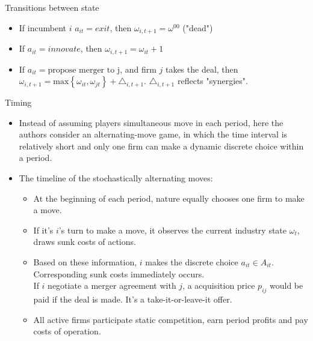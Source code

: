 \documentclass[aspectratio=169]{beamer}  %
\begin{document}
\begin{frame}{Transitions between state}
    \begin{itemize}
    \item If incumbent $i$ $a_{it}=exit$, then $\omega_{i,t+1}=\omega^{00}$ ("dead")\\
    \item If $a_{it}=innovate$, then $\omega_{i,t+1}=\omega_{it}+1$ \\
    \item If $a_{it}=\text{propose  merger  to j}$, and firm $j$ takes the deal, then $\omega_{i,t+1}=\text{max}\left\{\omega_{it}, \omega_{jt}\right\}+\triangle_{i, t+1}$. $\triangle_{i, t+1}$ reflects "synergies".
    
    \end{itemize}
\end{frame}

\begin{frame}{Timing}
    \begin{itemize}
    \item Instead of assuming players simultaneous move in each period, here the authors consider an alternating-move game, in which the time interval is relatively short and only one firm can make a dynamic discrete choice within a period. 
    \item The timeline of the stochastically alternating moves:
        \begin{itemize}
            \item At the beginning of each period, nature equally chooses one firm to make a move.
            \item If it's $i$'s turn to make a move, it observes the current industry state $\omega_t$, draws sunk costs of actions.
            \item Based on these information, $i$ makes the discrete choice $a_{it} \in A_{it}$. Corresponding sunk costs immediately occurs. \\
            If $i$ negotiate a merger agreement with $j$, a acquisition price $p_{ij}$ would be paid if the deal is made. It's a take-it-or-leave-it offer.
            \item All active firms participate static competition, earn period profits and pay costs of operation.
        \end{itemize}
    \end{itemize}
\end{frame}
\end{document}

